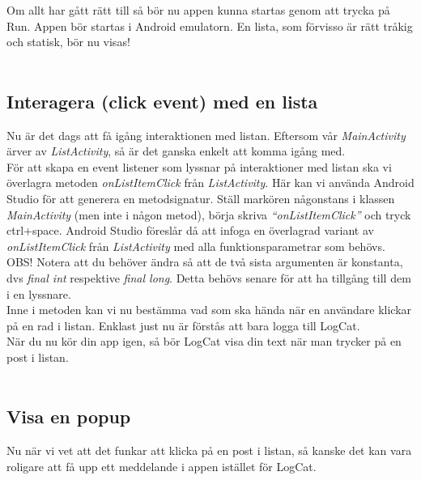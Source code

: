 \documentclass[11 pt, titlepage]{article} %
\begin{document}
Om allt har gått rätt till så bör nu appen kunna startas genom att trycka på Run. Appen bör startas i Android emulatorn. En lista, som förvisso är rätt tråkig och statisk, bör nu visas!\\ \\


\subsection{Interagera (click event) med en lista}
Nu är det dags att få igång interaktionen med listan.
Eftersom vår \textit{MainActivity} ärver av \textit{ListActivity}, så är det ganska enkelt att komma igång med.\\

För att skapa en event listener som lyssnar på interaktioner med listan ska vi överlagra metoden \textit{onListItemClick} från \textit{ListActivity}.
Här kan vi använda Android Studio för att generera en metodsignatur.
Ställ markören någonstans i klassen \textit{MainActivity} (men inte i någon metod), börja skriva \textit{“onListItemClick”} och tryck ctrl+space.
Android Studio föreslår då att infoga en överlagrad variant av \textit{onListItemClick} från \textit{ListActivity} med alla funktionsparametrar som behövs.\\

OBS! Notera att du behöver ändra så att de två sista argumenten är konstanta, dvs \textit{final int} respektive \textit{final long}.
Detta behövs senare för att ha tillgång till dem i en lyssnare.\\

Inne i metoden kan vi nu bestämma vad som ska hända när en användare klickar på en rad i listan.
Enklast just nu är förstås att bara logga till LogCat.\\

När du nu kör din app igen, så bör LogCat visa din text när man trycker på en post i listan.\\ \\

\subsection{Visa en popup}
Nu när vi vet att det funkar att klicka på en post i listan, så kanske det kan vara roligare att få upp ett meddelande i appen istället för LogCat.\\
\end{document}
